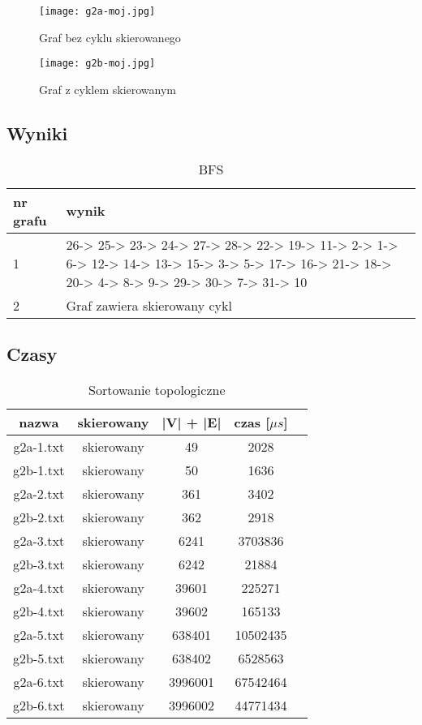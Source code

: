 \documentclass[12pt, letterpaper]{article}
\begin{document}
\begin{figure}[H]
    \centering
    \texttt{[image: g2a-moj.jpg]}
    \caption{Graf bez cyklu skierowanego}
\end{figure}

\begin{figure}[H]
    \centering
    \texttt{[image: g2b-moj.jpg]}
    \caption{Graf z cyklem skierowanym}
\end{figure}

\subsection{Wyniki}

\begin{table}[H]\centering
    \caption{BFS}
    \begin{tabular}{|p{1cm}|p{10cm}|}\hline
        nr grafu & wynik
        \\\hline
        1        & 26-> 25-> 23-> 24-> 27-> 28-> 22-> 19-> 11-> 2-> 1-> 6-> 12-> 14->
        13-> 15-> 3-> 5-> 17-> 16-> 21-> 18-> 20-> 4-> 8-> 9-> 29-> 30-> 7-> 31-> 10
        \\\hline
        2        & Graf zawiera skierowany cykl
        \\\hline
    \end{tabular}
\end{table}

\subsection{Czasy}

\begin{table}[H]\centering
    \caption{Sortowanie topologiczne}
    \begin{tabular}{|c|c|c|c|c|}\hline
        nazwa     & skierowany & |V| + |E| & czas [$\mu s$] \\\hline
        g2a-1.txt & skierowany & 49        & 2028      \\\hline
        g2b-1.txt & skierowany & 50        & 1636      \\\hline
        g2a-2.txt & skierowany & 361       & 3402      \\\hline
        g2b-2.txt & skierowany & 362       & 2918      \\\hline
        g2a-3.txt & skierowany & 6241      & 3703836   \\\hline
        g2b-3.txt & skierowany & 6242      & 21884     \\\hline
        g2a-4.txt & skierowany & 39601     & 225271    \\\hline
        g2b-4.txt & skierowany & 39602     & 165133    \\\hline
        g2a-5.txt & skierowany & 638401    & 10502435  \\\hline
        g2b-5.txt & skierowany & 638402    & 6528563   \\\hline
        g2a-6.txt & skierowany & 3996001   & 67542464  \\\hline
        g2b-6.txt & skierowany & 3996002   & 44771434  \\\hline
    \end{tabular}
\end{table}
\end{document}
